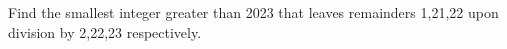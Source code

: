 Find the smallest integer greater than 2023 that leaves remainders 1,21,22 upon division by 2,22,23 respectively.
